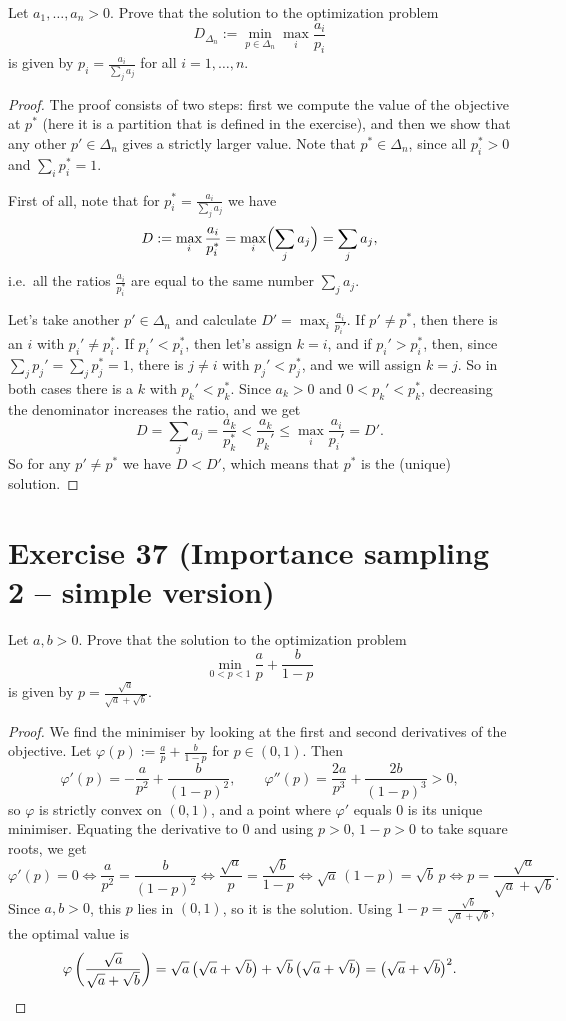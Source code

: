 \documentclass[11pt,a4paper]{article}
\begin{document}
Let $a_1,\dots,a_n > 0$. Prove that the solution to the optimization problem
\[
  D_{\Delta_n} := \min_{p \in \Delta_n} \max_i \frac{a_i}{p_i}
\]
is given by $p_i = \frac{a_i}{\sum_j a_j}$ for all $i = 1,\dots,n$.

\begin{proof}
The proof consists of two steps: first we compute the value of the objective at $p^*$ (here it is a
partition that is defined in the exercise), and then we show that any other $p' \in \Delta_n$ gives a
strictly larger value. Note that $p^* \in \Delta_n$, since all $p_i^* > 0$ and $\sum_i p_i^* = 1$.

First of all, note that for $p_i^* = \frac{a_i}{\sum_j a_j}$ we have
\[
  D := \max_i \frac{a_i}{p_i^*} = \max_i \Bigl(\sum_j a_j\Bigr) = \sum_j a_j ,
\]
i.e.\ all the ratios $\frac{a_i}{p_i^*}$ are equal to the same number $\sum_j a_j$.

Let's take another $p' \in \Delta_n$ and calculate $D' = \max_i \frac{a_i}{p_i'}$. If $p' \ne p^*$,
then there is an $i$ with $p_i' \ne p_i^*$. If $p_i' < p_i^*$, then let's assign $k = i$, and if
$p_i' > p_i^*$, then, since $\sum_j p_j' = \sum_j p_j^* = 1$, there is $j \ne i$ with $p_j' < p_j^*$, and
we will assign $k = j$. So in both cases there is a $k$ with $p_k' < p_k^*$. Since $a_k > 0$ and
$0 < p_k' < p_k^*$, decreasing the denominator increases the ratio, and we get
\[
  D = \sum_j a_j = \frac{a_k}{p_k^*} < \frac{a_k}{p_k'} \le \max_i \frac{a_i}{p_i'} = D' .
\]
So for any $p' \ne p^*$ we have $D < D'$, which means that $p^*$ is the (unique) solution.
\end{proof}

\section*{Exercise 37 (Importance sampling 2 -- simple version)}

Let $a, b > 0$. Prove that the solution to the optimization problem
\[
  \min_{0 < p < 1} \frac{a}{p} + \frac{b}{1-p}
\]
is given by $p = \frac{\sqrt{a}}{\sqrt{a} + \sqrt{b}}$.

\begin{proof}
We find the minimiser by looking at the first and second derivatives of the objective.
Let $\varphi(p) := \frac{a}{p} + \frac{b}{1-p}$ for $p \in (0,1)$. Then
\[
  \varphi'(p) = -\frac{a}{p^2} + \frac{b}{(1-p)^2}, \qquad
  \varphi''(p) = \frac{2a}{p^3} + \frac{2b}{(1-p)^3} > 0 ,
\]
so $\varphi$ is strictly convex on $(0,1)$, and a point where $\varphi'$ equals $0$ is its unique
minimiser. Equating the derivative to $0$ and using $p > 0$, $1-p > 0$ to take square roots, we get
\[
  \varphi'(p) = 0
  \iff \frac{a}{p^2} = \frac{b}{(1-p)^2}
  \iff \frac{\sqrt{a}}{p} = \frac{\sqrt{b}}{1-p}
  \iff \sqrt{a}\,(1-p) = \sqrt{b}\,p
  \iff p = \frac{\sqrt{a}}{\sqrt{a} + \sqrt{b}} .
\]
Since $a, b > 0$, this $p$ lies in $(0,1)$, so it is the solution. Using
$1 - p = \frac{\sqrt{b}}{\sqrt{a} + \sqrt{b}}$, the optimal value is
\[
  \varphi\left(\frac{\sqrt{a}}{\sqrt{a} + \sqrt{b}}\right)
  = \sqrt{a}\,\bigl(\sqrt{a} + \sqrt{b}\bigr) + \sqrt{b}\,\bigl(\sqrt{a} + \sqrt{b}\bigr)
  = \bigl(\sqrt{a} + \sqrt{b}\bigr)^2 . \qedhere
\]
\end{proof}
\end{document}
